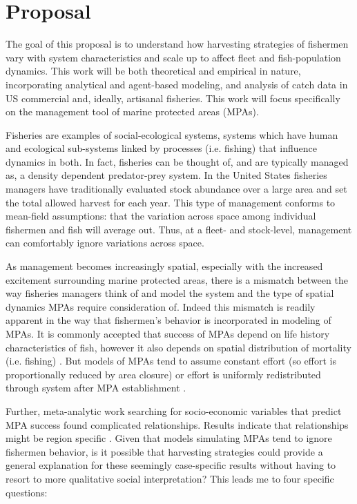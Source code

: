 \documentclass[12pt,a4paper]{report}
\begin{document}
\chapter{Proposal}
The goal of this proposal is to understand how harvesting strategies of fishermen vary with system characteristics and scale up to affect fleet and fish-population dynamics. This work will be both theoretical and empirical in nature, incorporating analytical and agent-based modeling, and analysis of catch data in US commercial and, ideally, artisanal fisheries. This work will focus specifically on the management tool of marine protected areas (MPAs). 

Fisheries are examples of social-ecological systems, systems which have human and ecological sub-systems linked by processes (i.e. fishing) that influence dynamics in both. In fact, fisheries can be thought of, and are typically managed as, a density dependent predator-prey system. In the United States fisheries managers have traditionally evaluated stock abundance over a large area and set the total allowed harvest for each year. This type of management conforms to mean-field assumptions: that the variation across space among individual fishermen and fish will average out. Thus, at a fleet- and stock-level, management can comfortably ignore variations across space. 

As management becomes increasingly spatial, especially with the increased excitement surrounding marine protected areas, there is a mismatch between the way fisheries managers think of and model the system and the type of spatial dynamics MPAs require consideration of. Indeed this mismatch is readily apparent in the way that fishermen's behavior is incorporated in modeling of MPAs. It is commonly accepted that success of MPAs depend on life history characteristics of fish, however it also depends on spatial distribution of mortality (i.e. fishing) \citep{Halpernetal:2004}. But models of MPAs tend to assume constant effort (so effort is proportionally reduced by area closure) or effort is uniformly redistributed through system after MPA establishment \citep{Branchetal:2006}.

Further, meta-analytic work searching for socio-economic variables that predict MPA success found complicated relationships. Results indicate that relationships might be region specific \citep{Pollnacetal:2010}. Given that models simulating MPAs tend to ignore fishermen behavior, is it possible that harvesting strategies could provide a general explanation for these seemingly case-specific results without having to resort to more qualitative social interpretation? This leads me to four specific questions:
\end{document}
